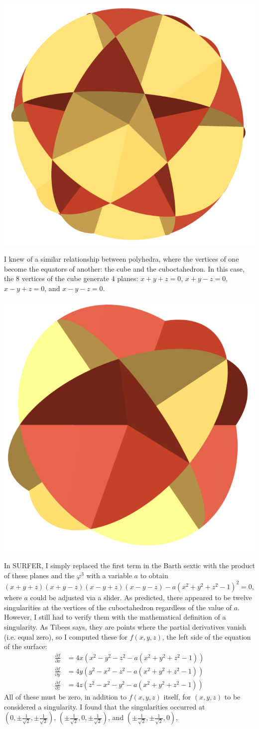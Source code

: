 \documentclass{article}
\begin{document}
\begin{center}
  \includegraphics[width=0.25\linewidth]{id.png}
\end{center}
I knew of a similar relationship between polyhedra,
where the vertices of one become the equators of another: the cube and the cuboctahedron.
In this case, the 8 vertices of the cube generate 4 planes:
$x+y+z=0$, $x+y-z=0$, $x-y+z=0$, and $x-y-z=0$.
\begin{center}
  \includegraphics[width=0.25\linewidth]{co.png}
\end{center}
In SURFER, I simply replaced the first term in the Barth sextic with the product of these planes
and the $\varphi^3$ with a variable $a$ to obtain
$$(x+y+z)(x+y-z)(x-y+z)(x-y-z)-a(x^2+y^2+z^2-1)^2=0,$$
where $a$ could be adjusted via a slider.
As predicted, there appeared to be twelve singularities at the vertices of the cuboctahedron
regardless of the value of $a$.
However, I still had to verify them with the mathematical definition of a singularity.
As Tibees says, they are points where the partial derivatives vanish (i.e. equal zero),
so I computed these for $f(x, y, z)$, the left side of the equation of the surface:
\begin{align*}
  \frac{\partial f}{\partial x} &= 4x(x^2-y^2-z^2-a(x^2+y^2+z^2-1)) \\
  \frac{\partial f}{\partial y} &= 4y(y^2-x^2-z^2-a(x^2+y^2+z^2-1)) \\
  \frac{\partial f}{\partial z} &= 4z(z^2-x^2-y^2-a(x^2+y^2+z^2-1))
\end{align*}
All of these must be zero, in addition to $f(x, y, z)$ itself,
for $(x, y, z)$ to be considered a singularity.
I found that the singularities occurred at
$\left(0, \pm\frac{1}{\sqrt{2}}, \pm\frac{1}{\sqrt{2}}\right)$,
$\left(\pm\frac{1}{\sqrt{2}}, 0, \pm\frac{1}{\sqrt{2}}\right)$, and
$\left(\pm\frac{1}{\sqrt{2}}, \pm\frac{1}{\sqrt{2}}, 0\right)$,
\end{document}
